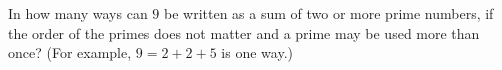 In how many ways can $9$ be written as a sum of two or more prime numbers, if the order of the primes does not matter and a prime may be used more than once? (For example, $9=2+2+5$ is one way.)
